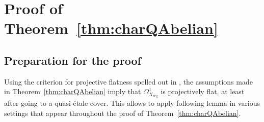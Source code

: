 \documentclass[JEP,XML,SOM,Unicode,published]{cedram}
\theoremstyle{plain}
\theoremstyle{definition}
\numberwithin{equation}{thm}
\numberwithin{enumi}{thm}
\newcommand{\reg}{\mathrm{reg}}
\begin{document}
\section{Proof of Theorem~\ref*{thm:charQAbelian}}

\subsection{Preparation for the proof}

Using the criterion for projective flatness spelled out in
\cite[Th.\,1.6]{GKP20a}, the assumptions made in Theorem~\ref{thm:charQAbelian}
imply that $\Omega^1_{X_{\reg}}$ is projectively flat, at least after going to a
quasi-étale cover. This allows to apply following lemma in various settings
that appear throughout the proof of Theorem~\ref{thm:charQAbelian}.
\end{document}
